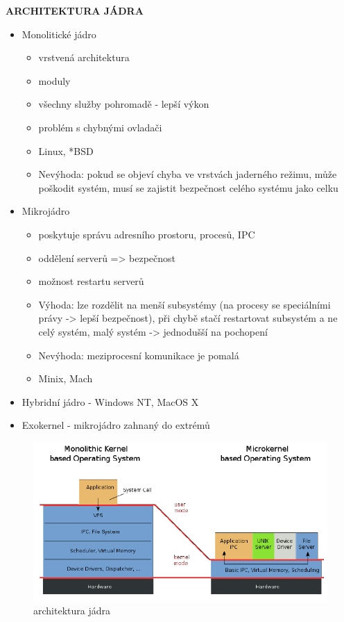 \documentclass[10pt,a4paper]{article}
\begin{document}
\textbf{ARCHITEKTURA JÁDRA}
\begin{itemize}
	\item Monolitické jádro
	\begin{itemize}	
		\item vrstvená architektura
		\item moduly
		\item všechny služby pohromadě - lepší výkon
		\item problém s chybnými ovladači
		\item Linux, *BSD
		\item Nevýhoda: pokud se objeví chyba ve vrstvách jaderného režimu, může poškodit systém, musí se zajistit bezpečnost celého systému jako celku
	\end{itemize}
	\item Mikrojádro 
	\begin{itemize}	
		\item poskytuje správu adresního prostoru, procesů, IPC
		\item oddělení serverů => bezpečnost
		\item možnost restartu serverů
		\item Výhoda: lze rozdělit na menší subsystémy (na procesy se speciálními právy -> lepší bezpečnost), při chybě stačí restartovat subsystém a ne celý systém, malý systém -> jednodušší na pochopení
		\item Nevýhoda: meziprocesní komunikace je pomalá
		\item Minix, Mach
	\end{itemize}
	\item Hybridní jádro - Windows NT, MacOS X
	\item Exokernel - mikrojádro zahnaný do extrémů
\end{itemize}

\begin{figure} [h]
		\includegraphics[scale=0.8]{img/architektura_jadra.png}
		\caption{architektura jádra}	
\end{figure}
\end{document}
